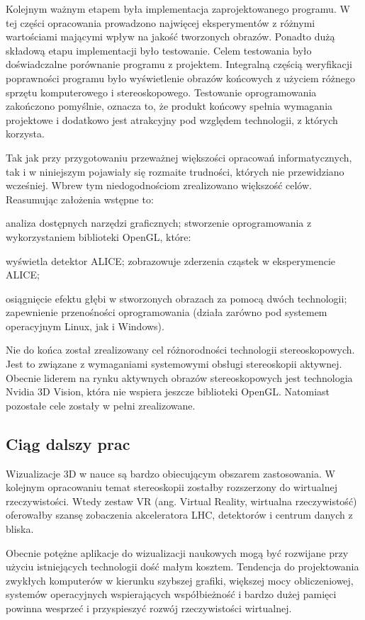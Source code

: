 Kolejnym ważnym etapem była implementacja zaprojektowanego programu. W tej części opracowania prowadzono najwięcej eksperymentów z różnymi wartościami mającymi wpływ na jakość tworzonych obrazów. Ponadto dużą składową etapu implementacji było testowanie. Celem testowania było doświadczalne porównanie programu z projektem. Integralną częścią weryfikacji poprawności programu było wyświetlenie obrazów końcowych z użyciem różnego sprzętu komputerowego i stereoskopowego. Testowanie oprogramowania zakończono pomyślnie, oznacza to, że produkt końcowy spełnia wymagania projektowe i dodatkowo jest atrakcyjny pod względem technologii, z których korzysta.

Tak jak przy przygotowaniu przeważnej większości opracowań informatycznych, tak i w niniejszym pojawiały się rozmaite trudności, których nie przewidziano wcześniej. Wbrew tym niedogodnościom zrealizowano większość celów. Reasumując założenia wstępne to:
\begin{itemize}
\itemi analiza dostępnych narzędzi graficznych;
\itemi stworzenie oprogramowania z wykorzystaniem biblioteki OpenGL, które:
\begin{itemize}
\itemii wyświetla detektor ALICE;
\itemii zobrazowuje zderzenia cząstek w eksperymencie ALICE;
\end{itemize}
\itemi osiągnięcie efektu głębi w stworzonych obrazach za pomocą dwóch technologii;
\itemi zapewnienie przenośności oprogramowania (działa zarówno pod systemem operacyjnym Linux, jak i Windows).
\end{itemize}

Nie do końca został zrealizowany cel różnorodności technologii stereoskopowych. Jest to związane z wymaganiami systemowymi obsługi stereoskopii aktywnej. Obecnie liderem na rynku aktywnych obrazów stereoskopowych jest technologia Nvidia 3D Vision, która nie wspiera jeszcze biblioteki OpenGL. Natomiast pozostałe cele zostały w pełni zrealizowane. 

\subsection{Ciąg dalszy prac}
Wizualizacje 3D w nauce są bardzo obiecującym obszarem zastosowania. W kolejnym opracowaniu temat stereoskopii zostałby rozszerzony do wirtualnej rzeczywistości. Wtedy zestaw VR (ang. Virtual Reality, wirtualna rzeczywistość) oferowałby szansę zobaczenia akceleratora LHC, detektorów i centrum danych z bliska.

Obecnie potężne aplikacje do wizualizacji naukowych mogą być rozwijane przy użyciu istniejących technologii dość małym kosztem. Tendencja do projektowania zwykłych komputerów w kierunku szybszej grafiki, większej mocy obliczeniowej, systemów operacyjnych wspierających współbieżność i bardzo dużej pamięci powinna wesprzeć i przyspieszyć rozwój rzeczywistości wirtualnej.

